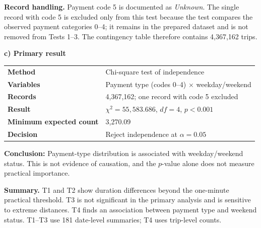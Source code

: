 \documentclass[10pt,a4paper]{article}
\begin{document}
\textbf{Record handling.} Payment code 5 is documented as \emph{Unknown}. The single record with code 5 is excluded only from this test because the test compares the observed payment categories 0--4; it remains in the prepared dataset and is not removed from Tests 1--3. The contingency table therefore contains 4,367,162 trips.

\textbf{c) Primary result}
\begin{center}\small
\begin{tabularx}{\linewidth}{@{}L{2.5cm}Y@{}}
\toprule
\textbf{Method} & Chi-square test of independence\\
\textbf{Variables} & Payment type (codes 0--4) $\times$ weekday/weekend\\
\textbf{Records} & 4,367,162; one record with code 5 excluded\\
\textbf{Result} & $\chi^2=55{,}583.686$, $df=4$, $p<0.001$\\
\textbf{Minimum expected count} & 3,270.09\\
\textbf{Decision} & Reject independence at $\alpha=0.05$\\
\bottomrule
\end{tabularx}
\end{center}
\textbf{Conclusion:} Payment-type distribution is associated with weekday/weekend status. This is not evidence of causation, and the $p$-value alone does not measure practical importance.


\textbf{Summary.} T1 and T2 show duration differences beyond the one-minute practical threshold. T3 is not significant in the primary analysis and is sensitive to extreme distances. T4 finds an association between payment type and weekend status. T1--T3 use 181 date-level summaries; T4 uses trip-level counts.
\end{document}
